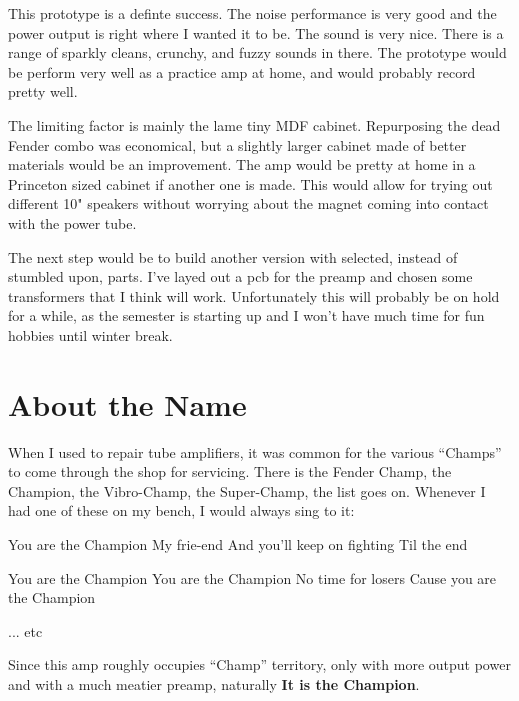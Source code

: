 \documentclass[pdftex,letterpaper,11pt]{article}
\begin{document}
This prototype is a definte success. The noise performance is very good and the power output is right where I wanted it to be. The sound is very nice. There is a range of sparkly cleans, crunchy, and fuzzy sounds in there. The prototype would be perform very well as a practice amp at home, and would probably record pretty well.

The limiting factor is mainly the lame tiny MDF cabinet. Repurposing the dead Fender combo was economical, but a slightly larger cabinet made of better materials would be an improvement. The amp would be pretty at home in a Princeton sized cabinet if another one is made. This would allow for trying out different 10" speakers without worrying about the magnet coming into contact with the power tube.

The next step would be to build another version with selected, instead of stumbled upon, parts. I've layed out a pcb for the preamp and chosen some transformers that I think will work. Unfortunately this will probably be on hold for a while, as the semester is starting up and I won't have much time for fun hobbies until winter break.

\section{About the Name}

When I used to repair tube amplifiers, it was common for the various ``Champs'' to come through the shop for servicing. There is the Fender Champ, the Champion, the Vibro-Champ, the Super-Champ, the list goes on. Whenever I had one of these on my bench, I would always sing to it:

\begin{poem}
\begin{stanza}
You are the Champion\verseline
My frie-end\verseline
And you'll keep on fighting\verseline
Til the end\end{stanza}

\begin{stanza}
You are the Champion\verseline
You are the Champion\verseline
No time for losers\verseline
Cause you are the Champion\end{stanza}
... etc
\end{poem}

Since this amp roughly occupies ``Champ'' territory, only with more output power and with a much meatier preamp, naturally \textbf{It is the Champion}.
\end{document}
